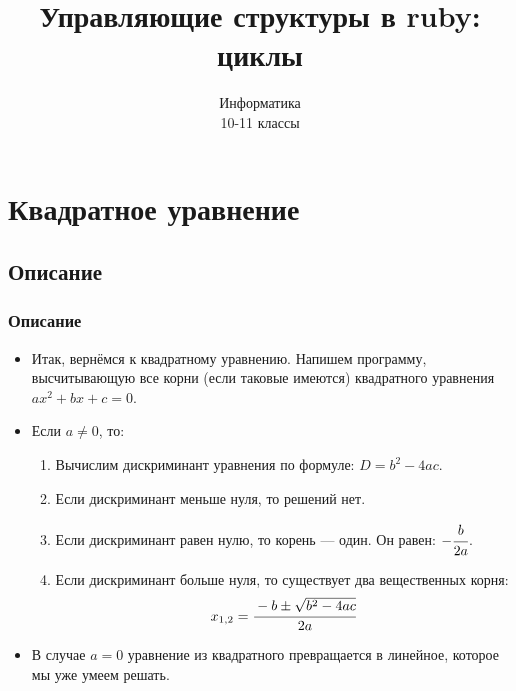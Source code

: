 \documentclass[compress,red]{beamer}
\title{Управляющие структуры в ruby: циклы}
\author{Информатика \\ 10-11 классы}
\begin{document}
\maketitle

\section{Квадратное уравнение}

\subsection{Описание}
\begin{frame}
  \frametitle{Описание}
  \begin{itemize}
    \item Итак, вернёмся к квадратному уравнению. Напишем программу, высчитывающую все корни (если таковые имеются) квадратного уравнения $ax^2+bx+c=0$.
    \item Если $a \neq 0$, то:
    \begin{enumerate}
      \item Вычислим дискриминант уравнения по формуле: $D = b^2 - 4ac$.
      \item Если дискриминант меньше нуля, то решений нет.
      \item Если дискриминант равен нулю, то корень --- один. Он равен: $-\cfrac{b}{2a}$.
      \item Если дискриминант больше нуля, то существует два вещественных корня:
        \begin{gather*}
          x_{1,2} = \cfrac{-b \pm \sqrt{b^2-4ac}}{2a}
        \end{gather*}
    \end{enumerate}
    \item В случае $a = 0$ уравнение из квадратного превращается в линейное, которое мы уже умеем решать.
  \end{itemize}
\end{frame}
\end{document}
